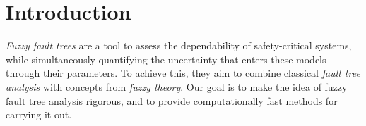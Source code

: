 \documentclass[runningheads]{llncs}
\renewcommand{\emph}[1]{{\it #1}}
\begin{document}
\begin{abstract}


We provide a rigorous framework for handling uncertainty in quantitative fault tree analysis based on fuzzy theory. 
We show that any algorithm 
for fault tree unreliability analysis can be adapted to this framework in a fully general and computationally efficient manner.
This result crucially leverages both the $\alpha$-cut representation of fuzzy numbers and the coherence property of fault trees.
We evaluate our algorithms on an established benchmark of synthetic fault trees, demonstrating their practical effectiveness.




\end{abstract}



\section{Introduction}
\label{sec:intro}

\emph{Fuzzy fault trees} are a tool to assess the dependability of safety-critical systems, while simultaneously quantifying the uncertainty that enters these models through their parameters. 
To achieve this, they aim to combine classical \emph{fault tree analysis} with concepts from \emph{fuzzy theory}.
Our goal is to make the idea of fuzzy fault tree analysis rigorous, and to provide computationally fast methods for carrying it out.
\vspace{-15pt}
\end{document}

